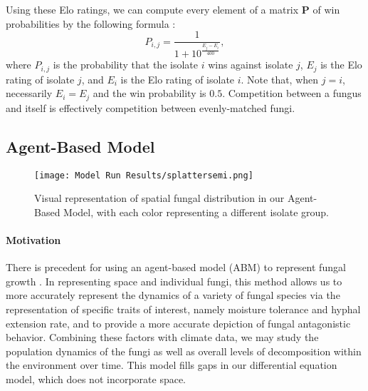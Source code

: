 \documentclass[12pt]{article}
\begin{document}
Using these Elo ratings, we can compute every element of a matrix $\mathbf{P}$ of win probabilities by the following formula \cite{elo}:
\begin{equation}\label{eq:probability}
P_{i,j}=\dfrac{1}{1+10^\frac{E_j-E_i}{400}},
\end{equation}
where $P_{i,j}$ is the probability that the isolate $i$ wins against isolate $j$, $E_j$ is the Elo rating of isolate $j$, and $E_i$ is the Elo rating of isolate $i$. Note that, when $j=i$, necessarily $E_i=E_j$ and the win probability is $0.5$. Competition between a fungus and itself is effectively competition between evenly-matched fungi.





















\subsection{Agent-Based Model}

\begin{wrapfigure}{R}{0.4\textwidth}
\centering
\texttt{[image: Model Run Results/splattersemi.png]}
\caption{Visual representation of spatial fungal distribution in our Agent-Based Model, with each color representing a different isolate group.}\label{fig:splatter1}\vspace{-2.5em}
\end{wrapfigure}  

\paragraph{Motivation}
There is precedent for using an agent-based model (ABM) to represent fungal growth \cite{THOMAS2020100963}. In representing space and individual fungi, this method allows us to more accurately represent the dynamics of a variety of fungal species via the representation of specific traits of interest, namely moisture tolerance and hyphal extension rate, and to provide a more accurate depiction of fungal antagonistic behavior.  Combining these factors with climate data, we may study the population dynamics of the fungi as well as overall levels of decomposition within the environment over time. This model fills gaps in our differential equation model, which does not incorporate space. 
\end{document}

